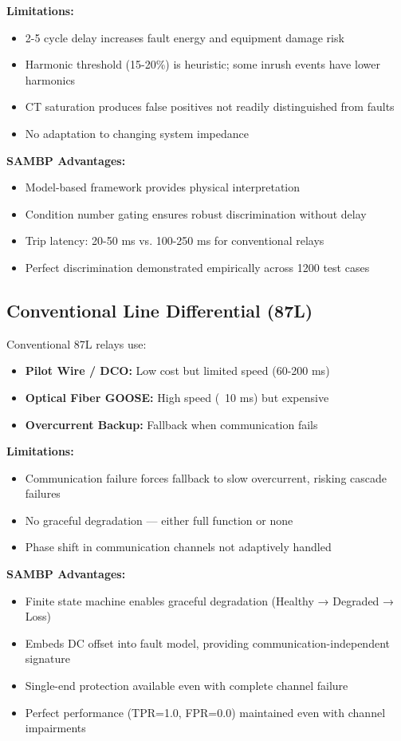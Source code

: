 \documentclass[12pt,a4paper]{article}
\newcommand{\key}[1]{\textbf{\textcolor{blue!70!black}{#1}}}
\begin{document}
\key{Limitations:}
\begin{itemize}
    \item 2-5 cycle delay increases fault energy and equipment damage risk
    \item Harmonic threshold (15-20\%) is heuristic; some inrush events have lower harmonics
    \item CT saturation produces false positives not readily distinguished from faults
    \item No adaptation to changing system impedance
\end{itemize}

\key{SAMBP Advantages:}
\begin{itemize}
    \item Model-based framework provides physical interpretation
    \item Condition number gating ensures robust discrimination without delay
    \item Trip latency: 20-50 ms vs. 100-250 ms for conventional relays
    \item Perfect discrimination demonstrated empirically across 1200 test cases
\end{itemize}

\subsection{Conventional Line Differential (87L)}
\label{subsec:comp_87l}

Conventional 87L relays use:
\begin{itemize}
    \item \textbf{Pilot Wire / DCO:} Low cost but limited speed (60-200 ms)
    \item \textbf{Optical Fiber GOOSE:} High speed (~10 ms) but expensive
    \item \textbf{Overcurrent Backup:} Fallback when communication fails
\end{itemize}

\key{Limitations:}
\begin{itemize}
    \item Communication failure forces fallback to slow overcurrent, risking cascade failures
    \item No graceful degradation — either full function or none
    \item Phase shift in communication channels not adaptively handled
\end{itemize}

\key{SAMBP Advantages:}
\begin{itemize}
    \item Finite state machine enables graceful degradation (Healthy → Degraded → Loss)
    \item Embeds DC offset into fault model, providing communication-independent signature
    \item Single-end protection available even with complete channel failure
    \item Perfect performance (TPR=1.0, FPR=0.0) maintained even with channel impairments
\end{itemize}
\end{document}
